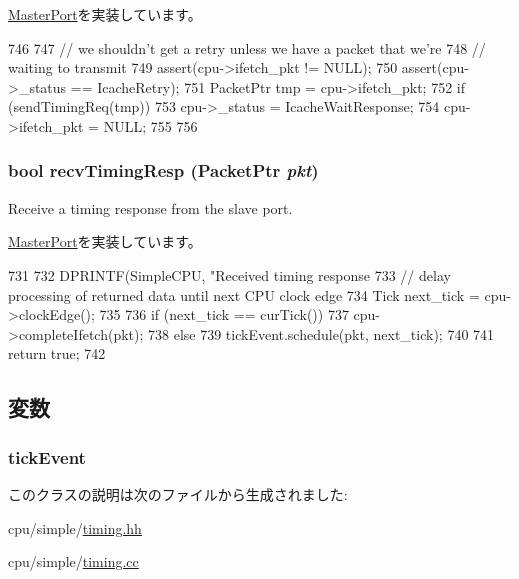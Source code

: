 \hyperlink{classMasterPort_ac1ccc3bcf7ebabb20b57fab99b2be5b0}{MasterPort}を実装しています。


\begin{DoxyCode}
746 {
747     // we shouldn't get a retry unless we have a packet that we're
748     // waiting to transmit
749     assert(cpu->ifetch_pkt != NULL);
750     assert(cpu->_status == IcacheRetry);
751     PacketPtr tmp = cpu->ifetch_pkt;
752     if (sendTimingReq(tmp)) {
753         cpu->_status = IcacheWaitResponse;
754         cpu->ifetch_pkt = NULL;
755     }
756 }
\end{DoxyCode}
\hypertarget{classTimingSimpleCPU_1_1IcachePort_a482dba5588f4bee43e498875a61e5e0b}{
\subsubsection[{recvTimingResp}]{\setlength{\rightskip}{0pt plus 5cm}bool recvTimingResp ({\bf PacketPtr} {\em pkt})}}
\label{classTimingSimpleCPU_1_1IcachePort_a482dba5588f4bee43e498875a61e5e0b}
Receive a timing response from the slave port. 

\hyperlink{classMasterPort_abd323548d6c93f8b0543f1fe3a86ca35}{MasterPort}を実装しています。


\begin{DoxyCode}
731 {
732     DPRINTF(SimpleCPU, "Received timing response %
733     // delay processing of returned data until next CPU clock edge
734     Tick next_tick = cpu->clockEdge();
735 
736     if (next_tick == curTick())
737         cpu->completeIfetch(pkt);
738     else
739         tickEvent.schedule(pkt, next_tick);
740 
741     return true;
742 }
\end{DoxyCode}


\subsection{変数}
\hypertarget{classTimingSimpleCPU_1_1IcachePort_a799a54dae0252f08692ee951528144dc}{
\subsubsection[{tickEvent}]{ {\bf tickEvent}}}
\label{classTimingSimpleCPU_1_1IcachePort_a799a54dae0252f08692ee951528144dc}


このクラスの説明は次のファイルから生成されました:\begin{DoxyCompactItemize}
\item 
cpu/simple/\hyperlink{timing_8hh}{timing.hh}\item 
cpu/simple/\hyperlink{timing_8cc}{timing.cc}\end{DoxyCompactItemize}
